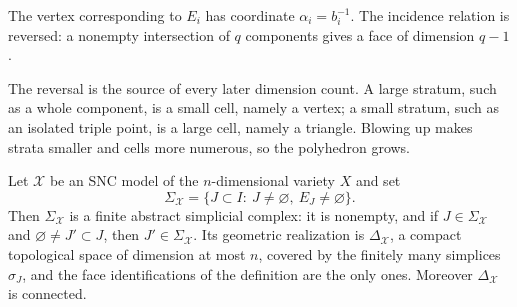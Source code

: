 The vertex corresponding to $E_i$ has coordinate $\alpha_i=b_i^{-1}$.
The incidence relation is reversed: a nonempty intersection of $q$
components gives a face of dimension $q-1$.

The reversal is the source of every later dimension count. A large stratum,
such as a whole component, is a small cell, namely a vertex; a small
stratum, such as an isolated triple point, is a large cell, namely a
triangle. Blowing up makes strata smaller and cells more numerous, so the
polyhedron grows.

\begin{lemma}
\label{lem:dual-complex-simplicial}
Let $\mathcal X$ be an SNC model of the $n$-dimensional variety $X$
and set
\[
 \Sigma_{\mathcal X}
 =\{J\subset I:\ J\neq\varnothing,\ E_J\neq\varnothing\}.
\]
Then $\Sigma_{\mathcal X}$ is a finite abstract simplicial complex: it is
nonempty, and if $J\in\Sigma_{\mathcal X}$ and
$\varnothing\neq J'\subset J$, then $J'\in\Sigma_{\mathcal X}$.
Its geometric realization is $\Delta_{\mathcal X}$, a compact topological
space of dimension at most $n$, covered by the finitely many simplices
$\sigma_J$, and the face identifications of the definition are the only
ones. Moreover $\Delta_{\mathcal X}$ is connected.
\end{lemma}

